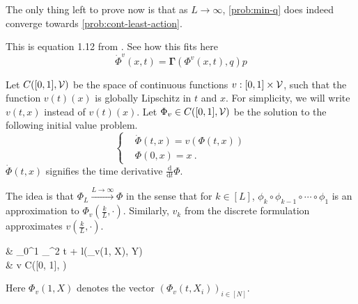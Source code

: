 
The only thing left to prove now is that as $L \rightarrow \infty$, \cref{prob:min-q} does indeed converge towards \cref{prob:cont-least-action}.



This is equation 1.12 from \cite{owhadi20}.
See how this fits here
\begin{equation}
	\label{eq:phi-v-differential-equation}
	\dot{\Phi}^v(x, t) = \mathbf{\Gamma}(\Phi^v(x, t), q) p
\end{equation}

Let $C([0, 1], \mathcal{V})$ be the space of continuous functions $v: [0, 1] \times \mathcal{V}$, such that the function $v(t)(x)$ is globally Lipschitz in $t$ and $x$.
For simplicity, we will write $v(t, x)$ instead of $v(t)(x)$.
Let $\Phi_v \in C([0, 1], \mathcal{V})$ be the solution to the following initial value problem.
\begin{equation}
	\begin{cases}
		&\dot{\Phi}(t, x) = v(\Phi(t, x))\\
		&\Phi(0, x) = x \ .
	\end{cases}
\end{equation}
$\dot{\Phi}(t, x)$ signifies the time derivative $\frac{\mathrm{d}}{\mathrm{d}t}\Phi$.

The idea is that $\Phi_L \stackrel{L \rightarrow \infty}{\longrightarrow} \Phi$ in the sense that for $k \in [L]$, $\phi_k \circ \phi_{k-1} \circ \cdots \circ \phi_1$ is an approximation to $\Phi_v(\frac{k}{L}, \cdot)$.
Similarly, $v_k$ from the discrete formulation approximates $v(\frac{k}{L}, \cdot)$.

\begin{problem}
	\label{prob:resnet-limit}
	\begin{cases}
		&  \int_{0}^{1} _\cV^2 t
		+ l(\Phi_v(1, X), Y)\\
		& v \in C([0, 1], \cV)\\
	\end{cases}
\end{problem}
Here $\Phi_v(1, X)$ denotes the vector $(\Phi_v(t, X_i))_{i \in [N]}$.

